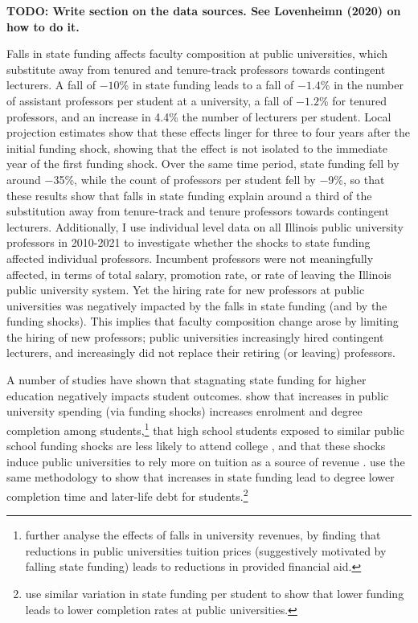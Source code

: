\textbf{TODO: Write section on the data sources.  See Lovenheimn (2020) on how to do it.}

Falls in state funding affects faculty composition at public universities, which substitute away from tenured and tenure-track professors towards contingent lecturers.
A fall of $-10$\% in state funding leads to a fall of $-1.4$\% in the number of assistant professors per student at a university, a fall of $-1.2$\% for tenured professors, and an increase in 4.4\% the number of lecturers per student.
Local projection estimates show that these effects linger for three to four years after the initial funding shock, showing that the effect is not isolated to the immediate year of the first funding shock. 
Over the same time period, state funding fell by around $-$35\%, while the count of professors per student fell by $-$9\%, so that these results show that falls in state funding explain around a third of the substitution away from tenure-track and tenure professors towards contingent lecturers.
Additionally, I use individual level data on all Illinois public university professors in 2010-2021 to investigate whether the shocks to state funding affected individual professors.
Incumbent professors were not meaningfully affected, in terms of total salary, promotion rate, or rate of leaving the Illinois public university system.
Yet the hiring rate for new professors at public universities was negatively impacted by the falls in state funding (and by the funding shocks).
This implies that faculty composition change arose by limiting the hiring of new professors; public universities increasingly hired contingent lecturers, and increasingly did not replace their retiring (or leaving) professors.

A number of studies have shown that stagnating state funding for higher education negatively impacts student outcomes.
\cite{NBERw23736} show that increases in public university spending (via funding shocks) increases enrolment and degree completion among students,\footnote{
    \cite{miller2022making} further analyse the effects of falls in university revenues, by finding that reductions in public universities tuition prices (suggestively motivated by falling state funding) leads to reductions in provided financial aid.
}
that high school students exposed to similar public school funding shocks are less likely to attend college \citep{jackson2021school}, and that these shocks induce public universities to rely more on tuition as a source of revenue \citep{bound2019public}.
\cite{NBERw27885} use the same methodology to show that increases in state funding lead to degree lower completion time and later-life debt for students.\footnote{
    \cite{bound2007cohort} use similar variation in state funding per student to show that lower funding leads to lower completion rates at public universities.
}

